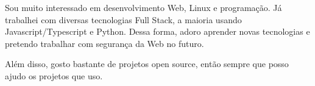 

\begin{cvparagraph}

Sou muito interessado em desenvolvimento Web, Linux e programação. Já trabalhei com diversas tecnologias Full Stack, a maioria usando Javascript/Typescript e Python. 
Dessa forma, adoro aprender novas tecnologias e pretendo trabalhar com segurança da Web no futuro.
\end{cvparagraph}

\begin{cvparagraph}

Além disso, gosto bastante de projetos open source, então sempre que posso ajudo os projetos que uso.

\end{cvparagraph}